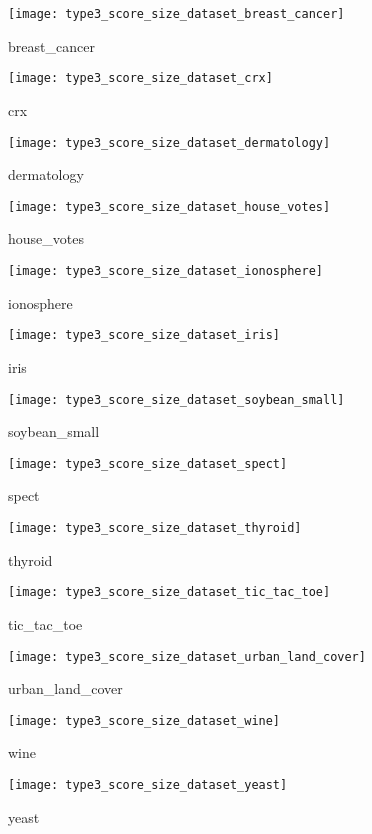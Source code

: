 \begin{figure}[H]\texttt{[image: type3\_score\_size\_dataset\_breast\_cancer]}\centering\caption{breast\_cancer}\end{figure}
\begin{figure}[H]\texttt{[image: type3\_score\_size\_dataset\_crx]}\centering\caption{crx}\end{figure}
\begin{figure}[H]\texttt{[image: type3\_score\_size\_dataset\_dermatology]}\centering\caption{dermatology}\end{figure}
\begin{figure}[H]\texttt{[image: type3\_score\_size\_dataset\_house\_votes]}\centering\caption{house\_votes}\end{figure}
\begin{figure}[H]\texttt{[image: type3\_score\_size\_dataset\_ionosphere]}\centering\caption{ionosphere}\end{figure}
\begin{figure}[H]\texttt{[image: type3\_score\_size\_dataset\_iris]}\centering\caption{iris}\end{figure}
\begin{figure}[H]\texttt{[image: type3\_score\_size\_dataset\_soybean\_small]}\centering\caption{soybean\_small}\end{figure}
\begin{figure}[H]\texttt{[image: type3\_score\_size\_dataset\_spect]}\centering\caption{spect}\end{figure}
\begin{figure}[H]\texttt{[image: type3\_score\_size\_dataset\_thyroid]}\centering\caption{thyroid}\end{figure}
\begin{figure}[H]\texttt{[image: type3\_score\_size\_dataset\_tic\_tac\_toe]}\centering\caption{tic\_tac\_toe}\end{figure}
\begin{figure}[H]\texttt{[image: type3\_score\_size\_dataset\_urban\_land\_cover]}\centering\caption{urban\_land\_cover}\end{figure}
\begin{figure}[H]\texttt{[image: type3\_score\_size\_dataset\_wine]}\centering\caption{wine}\end{figure}
\begin{figure}[H]\texttt{[image: type3\_score\_size\_dataset\_yeast]}\centering\caption{yeast}\end{figure}

